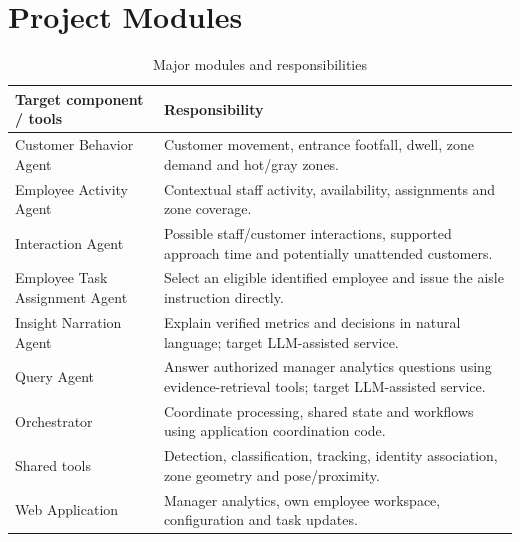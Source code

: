 \section{Project Modules}
\begin{table}[H]
\centering
\caption{Major modules and responsibilities}
\begin{tabular}{P{0.25\textwidth}P{0.65\textwidth}}
\toprule
Target component / tools & Responsibility\\
\midrule
Customer Behavior Agent & Customer movement, entrance footfall, dwell, zone demand and hot/gray zones.\\
Employee Activity Agent & Contextual staff activity, availability, assignments and zone coverage.\\
Interaction Agent & Possible staff/customer interactions, supported approach time and potentially unattended customers.\\
Employee Task Assignment Agent & Select an eligible identified employee and issue the aisle instruction directly.\\
Insight Narration Agent & Explain verified metrics and decisions in natural language; target LLM-assisted service.\\
Query Agent & Answer authorized manager analytics questions using evidence-retrieval tools; target LLM-assisted service.\\
Orchestrator & Coordinate processing, shared state and workflows using application coordination code.\\
Shared tools & Detection, classification, tracking, identity association, zone geometry and pose/proximity.\\
Web Application & Manager analytics, own employee workspace, configuration and task updates.\\
\bottomrule
\end{tabular}
\end{table}

